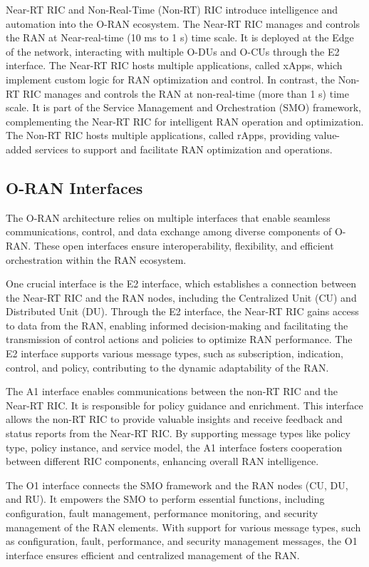 Near-RT RIC and Non-Real-Time (Non-RT) RIC introduce intelligence and automation into the O-RAN ecosystem.
The Near-RT RIC manages and controls the RAN at Near-real-time (10 ms to 1 s) time scale.
It is deployed at the Edge of the network, interacting with multiple O-DUs and O-CUs through the E2 interface.
The Near-RT RIC hosts multiple applications, called xApps, which implement custom logic for RAN optimization and control.
In contrast, the Non-RT RIC manages and controls the RAN at non-real-time (more than 1 s) time scale.
It is part of the Service Management and Orchestration (SMO) framework, complementing the Near-RT RIC for intelligent RAN operation and optimization.
The Non-RT RIC hosts multiple applications, called rApps, providing value-added services to support and facilitate RAN optimization and operations.

\subsection{O-RAN Interfaces} \label{subsec:interfaces}

The O-RAN architecture relies on multiple interfaces that enable seamless communications, control, and data exchange among diverse components of O-RAN. These open interfaces ensure interoperability, flexibility, and efficient orchestration within the RAN ecosystem.

One crucial interface is the E2 interface, which establishes a connection between the Near-RT RIC and the RAN nodes, including the Centralized Unit (CU) and Distributed Unit (DU). Through the E2 interface, the Near-RT RIC gains access to data from the RAN, enabling informed decision-making and facilitating the transmission of control actions and policies to optimize RAN performance.
The E2 interface supports various message types, such as subscription, indication, control, and policy, contributing to the dynamic adaptability of the RAN\@.

The A1 interface enables communications between the non-RT RIC and the Near-RT RIC. It is responsible for policy guidance and enrichment.
This interface allows the non-RT RIC to provide valuable insights and receive feedback and status reports from the Near-RT RIC. By supporting message types like policy type, policy instance, and service model, the A1 interface fosters cooperation between different RIC components, enhancing overall RAN intelligence.

The O1 interface connects the SMO framework and the RAN nodes (CU, DU, and RU). It empowers the SMO to perform essential functions, including configuration, fault management, performance monitoring, and security management of the RAN elements.
With support for various message types, such as configuration, fault, performance, and security management messages, the O1 interface ensures efficient and centralized management of the RAN\@.

